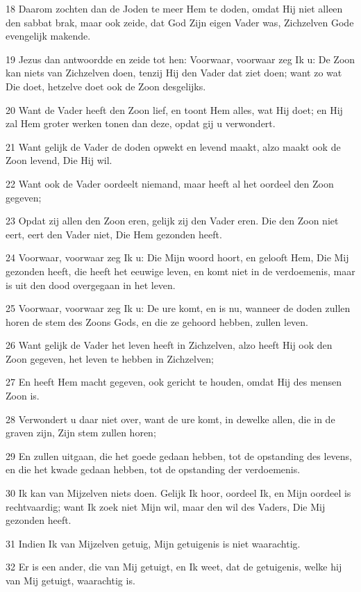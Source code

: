 \par 18 Daarom zochten dan de Joden te meer Hem te doden, omdat Hij niet alleen den sabbat brak, maar ook zeide, dat God Zijn eigen Vader was, Zichzelven Gode evengelijk makende.
\par 19 Jezus dan antwoordde en zeide tot hen: Voorwaar, voorwaar zeg Ik u: De Zoon kan niets van Zichzelven doen, tenzij Hij den Vader dat ziet doen; want zo wat Die doet, hetzelve doet ook de Zoon desgelijks.
\par 20 Want de Vader heeft den Zoon lief, en toont Hem alles, wat Hij doet; en Hij zal Hem groter werken tonen dan deze, opdat gij u verwondert.
\par 21 Want gelijk de Vader de doden opwekt en levend maakt, alzo maakt ook de Zoon levend, Die Hij wil.
\par 22 Want ook de Vader oordeelt niemand, maar heeft al het oordeel den Zoon gegeven;
\par 23 Opdat zij allen den Zoon eren, gelijk zij den Vader eren. Die den Zoon niet eert, eert den Vader niet, Die Hem gezonden heeft.
\par 24 Voorwaar, voorwaar zeg Ik u: Die Mijn woord hoort, en gelooft Hem, Die Mij gezonden heeft, die heeft het eeuwige leven, en komt niet in de verdoemenis, maar is uit den dood overgegaan in het leven.
\par 25 Voorwaar, voorwaar zeg Ik u: De ure komt, en is nu, wanneer de doden zullen horen de stem des Zoons Gods, en die ze gehoord hebben, zullen leven.
\par 26 Want gelijk de Vader het leven heeft in Zichzelven, alzo heeft Hij ook den Zoon gegeven, het leven te hebben in Zichzelven;
\par 27 En heeft Hem macht gegeven, ook gericht te houden, omdat Hij des mensen Zoon is.
\par 28 Verwondert u daar niet over, want de ure komt, in dewelke allen, die in de graven zijn, Zijn stem zullen horen;
\par 29 En zullen uitgaan, die het goede gedaan hebben, tot de opstanding des levens, en die het kwade gedaan hebben, tot de opstanding der verdoemenis.
\par 30 Ik kan van Mijzelven niets doen. Gelijk Ik hoor, oordeel Ik, en Mijn oordeel is rechtvaardig; want Ik zoek niet Mijn wil, maar den wil des Vaders, Die Mij gezonden heeft.
\par 31 Indien Ik van Mijzelven getuig, Mijn getuigenis is niet waarachtig.
\par 32 Er is een ander, die van Mij getuigt, en Ik weet, dat de getuigenis, welke hij van Mij getuigt, waarachtig is.
